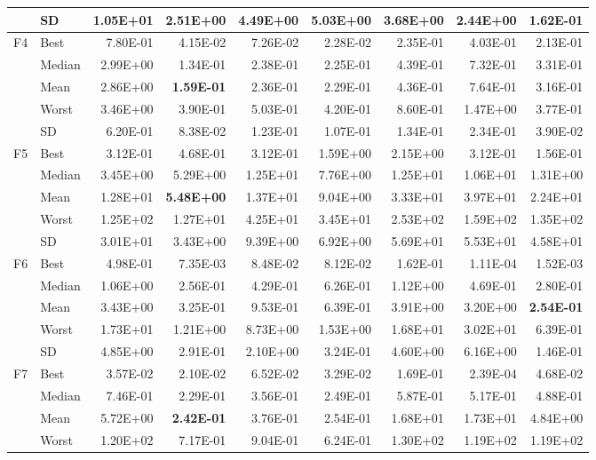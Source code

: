 \documentclass[algorithms,article,submit,moreauthors,pdftex]{Definitions/mdpi}
\newcommand{\bestval}[1]{\textbf{#1}}
\begin{document}
\begin{table}[p]
{\begin{tabular}{llrrrrrrr}
 & SD & 1.05E+01 & 2.51E+00 & 4.49E+00 & 5.03E+00 & 3.68E+00 & 2.44E+00 & 1.62E-01 \\
\midrule
F4 & Best & 7.80E-01 & 4.15E-02 & 7.26E-02 & 2.28E-02 & 2.35E-01 & 4.03E-01 & 2.13E-01 \\
 & Median & 2.99E+00 & 1.34E-01 & 2.38E-01 & 2.25E-01 & 4.39E-01 & 7.32E-01 & 3.31E-01 \\
 & Mean & 2.86E+00 & \bestval{1.59E-01} & 2.36E-01 & 2.29E-01 & 4.36E-01 & 7.64E-01 & 3.16E-01 \\
 & Worst & 3.46E+00 & 3.90E-01 & 5.03E-01 & 4.20E-01 & 8.60E-01 & 1.47E+00 & 3.77E-01 \\
 & SD & 6.20E-01 & 8.38E-02 & 1.23E-01 & 1.07E-01 & 1.34E-01 & 2.34E-01 & 3.90E-02 \\
\midrule
F5 & Best & 3.12E-01 & 4.68E-01 & 3.12E-01 & 1.59E+00 & 2.15E+00 & 3.12E-01 & 1.56E-01 \\
 & Median & 3.45E+00 & 5.29E+00 & 1.25E+01 & 7.76E+00 & 1.25E+01 & 1.06E+01 & 1.31E+00 \\
 & Mean & 1.28E+01 & \bestval{5.48E+00} & 1.37E+01 & 9.04E+00 & 3.33E+01 & 3.97E+01 & 2.24E+01 \\
 & Worst & 1.25E+02 & 1.27E+01 & 4.25E+01 & 3.45E+01 & 2.53E+02 & 1.59E+02 & 1.35E+02 \\
 & SD & 3.01E+01 & 3.43E+00 & 9.39E+00 & 6.92E+00 & 5.69E+01 & 5.53E+01 & 4.58E+01 \\
\midrule
F6 & Best & 4.98E-01 & 7.35E-03 & 8.48E-02 & 8.12E-02 & 1.62E-01 & 1.11E-04 & 1.52E-03 \\
 & Median & 1.06E+00 & 2.56E-01 & 4.29E-01 & 6.26E-01 & 1.12E+00 & 4.69E-01 & 2.80E-01 \\
 & Mean & 3.43E+00 & 3.25E-01 & 9.53E-01 & 6.39E-01 & 3.91E+00 & 3.20E+00 & \bestval{2.54E-01} \\
 & Worst & 1.73E+01 & 1.21E+00 & 8.73E+00 & 1.53E+00 & 1.68E+01 & 3.02E+01 & 6.39E-01 \\
 & SD & 4.85E+00 & 2.91E-01 & 2.10E+00 & 3.24E-01 & 4.60E+00 & 6.16E+00 & 1.46E-01 \\
\midrule
F7 & Best & 3.57E-02 & 2.10E-02 & 6.52E-02 & 3.29E-02 & 1.69E-01 & 2.39E-04 & 4.68E-02 \\
 & Median & 7.46E-01 & 2.29E-01 & 3.56E-01 & 2.49E-01 & 5.87E-01 & 5.17E-01 & 4.88E-01 \\
 & Mean & 5.72E+00 & \bestval{2.42E-01} & 3.76E-01 & 2.54E-01 & 1.68E+01 & 1.73E+01 & 4.84E+00 \\
 & Worst & 1.20E+02 & 7.17E-01 & 9.04E-01 & 6.24E-01 & 1.30E+02 & 1.19E+02 & 1.19E+02 \\

\end{tabular}}
\end{table}
\end{document}
